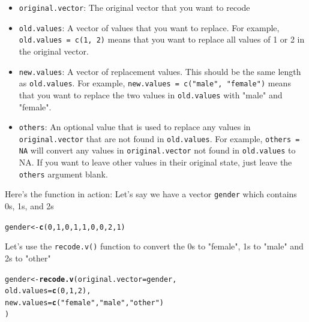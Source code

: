 \documentclass{tufte-book}\usepackage[]{graphicx}\usepackage[]{color}
\makeatletter
\newcommand{\hlnum}[1]{\textcolor[rgb]{0.686,0.059,0.569}{#1}}%
\newcommand{\hlstr}[1]{\textcolor[rgb]{0.192,0.494,0.8}{#1}}%
\newcommand{\hlstd}[1]{\textcolor[rgb]{0.345,0.345,0.345}{#1}}%
\newcommand{\hlkwb}[1]{\textcolor[rgb]{0.69,0.353,0.396}{#1}}%
\newcommand{\hlkwc}[1]{\textcolor[rgb]{0.333,0.667,0.333}{#1}}%
\newcommand{\hlkwd}[1]{\textcolor[rgb]{0.737,0.353,0.396}{\textbf{#1}}}%
\newenvironment{kframe}{%
 \def\at@end@of@kframe{}%
 \ifinner\ifhmode%
  \def\at@end@of@kframe{\end{minipage}}%
  \begin{minipage}{\columnwidth}%
 \fi\fi%
 \def\FrameCommand##1{\hskip\@totalleftmargin \hskip-\fboxsep
 \colorbox{shadecolor}{##1}\hskip-\fboxsep
     \hskip-\linewidth \hskip-\@totalleftmargin \hskip\columnwidth}%
 \MakeFramed {\advance\hsize-\width
   \@totalleftmargin\z@ \linewidth\hsize
   \@setminipage}}%
 {\par\unskip\endMakeFramed%
 \at@end@of@kframe}
\newenvironment{knitrout}{}{} %
\makeatother
\begin{document}
\begin{itemize}

 \item \texttt{original.vector}: The original vector that you want to recode
 \item \texttt{old.values}: A vector of values that you want to replace. For example, \texttt{old.values = c(1, 2)} means that you want to replace all values of 1 or 2 in the original vector.
 \item \texttt{new.values}: A vector of replacement values. This should be the same length as \texttt{old.values}. For example, \texttt{new.values = c("male", "female")} means that you want to replace the two values in \texttt{old.values} with "male" and "female".
 \item \texttt{others}: An optional value that is used to replace any values in \texttt{original.vector} that are not found in \texttt{old.values}. For example, \texttt{others = NA} will convert any values in \texttt{original.vector} not found in \texttt{old.values} to NA. If you want to leave other values in their original state, just leave the \texttt{others} argument blank.

\end{itemize}



Here's the function in action: Let's say we have a vector \texttt{gender} which contains 0s, 1s, and 2s

\begin{knitrout}
\color{fgcolor}\begin{kframe}
\begin{alltt}
\hlstd{gender} \hlkwb{<-} \hlkwd{c}\hlstd{(}\hlnum{0}\hlstd{,} \hlnum{1}\hlstd{,} \hlnum{0}\hlstd{,} \hlnum{1}\hlstd{,} \hlnum{1}\hlstd{,} \hlnum{0}\hlstd{,} \hlnum{0}\hlstd{,} \hlnum{2}\hlstd{,} \hlnum{1}\hlstd{)}
\end{alltt}
\end{kframe}
\end{knitrout}

Let's use the \texttt{recode.v()} function to convert the 0s to "female", 1s to "male" and 2s to "other"

\begin{footnotesize}
\begin{knitrout}
\color{fgcolor}\begin{kframe}
\begin{alltt}
\hlstd{gender} \hlkwb{<-} \hlkwd{recode.v}\hlstd{(}\hlkwc{original.vector} \hlstd{= gender,}
         \hlkwc{old.values} \hlstd{=} \hlkwd{c}\hlstd{(}\hlnum{0}\hlstd{,} \hlnum{1}\hlstd{,} \hlnum{2}\hlstd{),}
         \hlkwc{new.values} \hlstd{=} \hlkwd{c}\hlstd{(}\hlstr{"female"}\hlstd{,} \hlstr{"male"}\hlstd{,} \hlstr{"other"}\hlstd{)}
\hlstd{)}
\end{alltt}
\end{kframe}
\end{knitrout}
\end{footnotesize}
\end{document}
